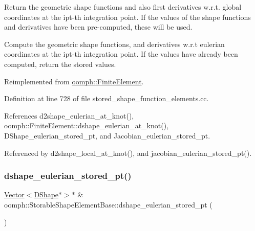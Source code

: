 Return the geometric shape functions and also first derivatives w.\+r.\+t. global coordinates at the ipt-\/th integration point. If the values of the shape functions and derivatives have been pre-\/computed, these will be used. 

Compute the geometric shape functions, and derivatives w.\+r.\+t eulerian coordinates at the ipt-\/th integration point. If the values have already been computed, return the stored values. 

Reimplemented from \hyperlink{classoomph_1_1FiniteElement_a368c44e295e35dd0b697be3222ce7b2f}{oomph\+::\+Finite\+Element}.



Definition at line 728 of file stored\+\_\+shape\+\_\+function\+\_\+elements.\+cc.



References d2shape\+\_\+eulerian\+\_\+at\+\_\+knot(), oomph\+::\+Finite\+Element\+::dshape\+\_\+eulerian\+\_\+at\+\_\+knot(), D\+Shape\+\_\+eulerian\+\_\+stored\+\_\+pt, and Jacobian\+\_\+eulerian\+\_\+stored\+\_\+pt.



Referenced by d2shape\+\_\+local\+\_\+at\+\_\+knot(), and jacobian\+\_\+eulerian\+\_\+stored\+\_\+pt().

\mbox{\label{classoomph_1_1StorableShapeElementBase_a7570ad21479b51361f2e7ac68af93387}} 
\subsubsection{\texorpdfstring{dshape\+\_\+eulerian\+\_\+stored\+\_\+pt()}{dshape\_eulerian\_stored\_pt()}\hspace{0.1cm}{\footnotesize\ttfamily [1/2]}}
{\footnotesize\ttfamily \hyperlink{classoomph_1_1Vector}{Vector}$<$\hyperlink{classoomph_1_1DShape}{D\+Shape}$\ast$$>$$\ast$ \& oomph\+::\+Storable\+Shape\+Element\+Base\+::dshape\+\_\+eulerian\+\_\+stored\+\_\+pt (\begin{DoxyParamCaption}{ }\end{DoxyParamCaption})\hspace{0.3cm}{\ttfamily [inline]}}




